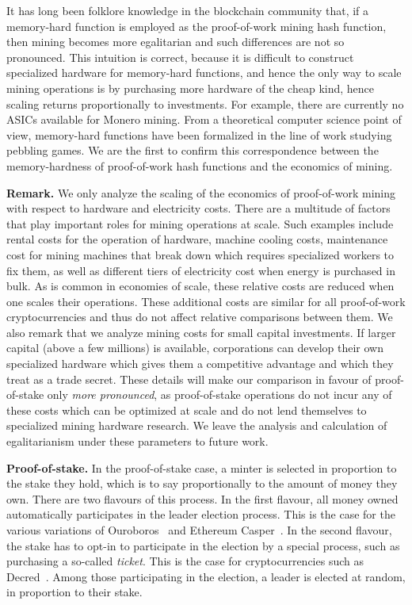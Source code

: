 It
has long been folklore knowledge in the blockchain community that, if a
memory-hard function is employed as the proof-of-work mining hash function, then
mining becomes more egalitarian and such differences are not so pronounced. This intuition is correct, because
it is difficult to construct specialized hardware for memory-hard functions, and
hence the only way to scale mining operations is by purchasing more hardware of
the cheap kind, hence scaling returns proportionally to investments. For
example, there are currently no ASICs available for Monero mining. From a theoretical computer
science point of view, memory-hard functions have been formalized in the line of
work studying pebbling games. We are the first to confirm this correspondence between the
memory-hardness of proof-of-work hash functions and the economics of mining.

\noindent
\textbf{Remark.}
We only analyze the scaling of the economics of proof-of-work mining with
respect to hardware and electricity costs. There are a multitude of factors that
play important roles for mining operations at scale. Such examples include rental
costs for the operation of hardware, machine cooling costs, maintenance cost
for mining machines that break down which requires specialized workers to fix
them, as well as different tiers of electricity cost when energy is purchased in
bulk. As is common in economies of scale, these relative costs are reduced when
one scales their operations. These additional costs are similar for all
proof-of-work cryptocurrencies and thus do not affect relative comparisons
between them. We also remark that we analyze mining costs for small capital
investments. If larger capital (above a few millions) is available,
corporations can develop their own specialized hardware which
gives them a competitive advantage and which they treat as a trade secret.
These details will make our comparison in favour of proof-of-stake only
\emph{more pronounced}, as proof-of-stake operations do not incur any
of these costs which can be optimized at scale and do not lend themselves to
specialized mining hardware research. We leave the analysis and calculation
of egalitarianism under these parameters to future work.

\noindent\textbf{Proof-of-stake.}
In the proof-of-stake case, a minter is selected in proportion to the stake they
hold, which is to say proportionally to the amount of money they own. There are
two flavours of this process. In the first flavour, all money owned automatically participates in the leader election
process. This is the case for the various variations of Ouroboros~\cite{ouroboros}
and Ethereum Casper~\cite{casper}. In the second flavour, the stake has to opt-in to participate in
the election by a special process, such as purchasing a so-called \emph{ticket}. This is the case for cryptocurrencies such as
Decred~\cite{decred}. Among those participating in the election, a leader is
elected at random, in proportion to their stake.


